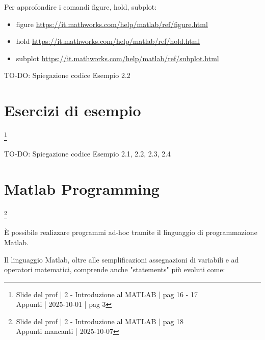 \begin{tcolorbox}
    Per approfondire i comandi figure, hold, subplot: 

    \begin{itemize}
        \item figure \url{https://it.mathworks.com/help/matlab/ref/figure.html} 
        \item hold \url{https://it.mathworks.com/help/matlab/ref/hold.html} 
        \item subplot \url{https://it.mathworks.com/help/matlab/ref/subplot.html}
    \end{itemize} 

\end{tcolorbox}


\begin{tcolorbox}[colback=green!5!white,colframe=green!75!black]
TO-DO: Spiegazione codice Esempio 2.2 
\end{tcolorbox} 

\newpage 

\section{Esercizi di esempio}

\footnote{ 
    Slide del prof | 2 - Introduzione al MATLAB | pag 16 - 17\\
    Appunti | 2025-10-01 | pag 3
}

\begin{tcolorbox}[colback=green!5!white,colframe=green!75!black]
TO-DO: Spiegazione codice Esempio 2.1, 2.2, 2.3, 2.4 
\end{tcolorbox} 

\newpage 

\section{Matlab Programming}

\footnote{ 
    Slide del prof | 2 - Introduzione al MATLAB | pag 18\\
    Appunti mancanti | 2025-10-07 
}

È possibile realizzare programmi ad-hoc tramite il linguaggio di programmazione Matlab. \newline 

Il linguaggio Matlab, oltre alle semplificazioni assegnazioni di variabili e ad operatori matematici, comprende anche "statements" più evoluti come: 


